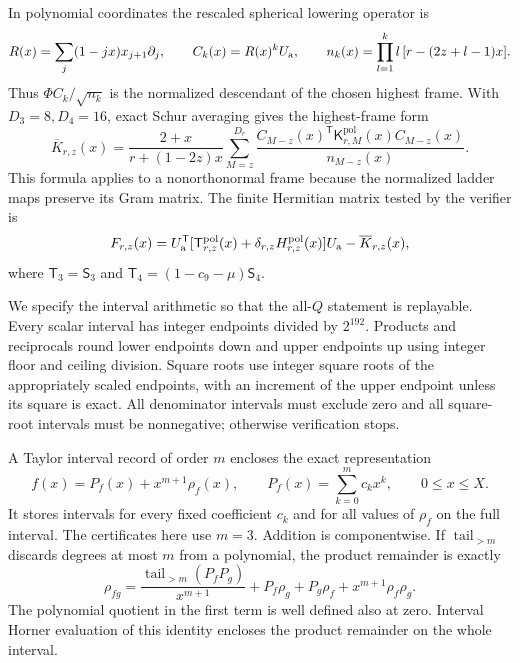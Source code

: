 In polynomial coordinates the rescaled spherical lowering operator is
\begin{equation}\label{eq:interval-descendant-polynomial}
 R(x)=\sum_j(1-jx)x_{j+1}\partial_j,
 \qquad C_k(x)=R(x)^kU_{\rm a},\qquad
 n_k(x)=\prod_{l=1}^k l\,[r-(2z+l-1)x].
\end{equation}
Thus $\Phi C_k/\sqrt{n_k}$ is the normalized descendant of the chosen
highest frame. With $D_3=8,D_4=16$, exact Schur averaging gives the
highest-frame form
\begin{equation}\label{eq:interval-Schur}
 \overline K_{r,z}(x)=\frac{2+x}{r+(1-2z)x}
 \sum_{M=z}^{D_r}
 \frac{C_{M-z}(x)^{\mathsf T}\mathsf K^{\mathrm{pol}}_{r,M}(x)
 C_{M-z}(x)}{n_{M-z}(x)}.
\end{equation}
This formula applies to a nonorthonormal frame because the normalized
ladder maps preserve its Gram matrix. The finite Hermitian matrix tested
by the verifier is
\begin{equation}\label{eq:interval-final-matrix}
 F_{r,z}(x)=U_{\rm a}^{\mathsf T}
  [\mathsf T^{\mathrm{pol}}_{r,z}(x)
     +\delta_{r,z}H^{\mathrm{pol}}_{r,z}(x)]U_{\rm a}
       -\overline K_{r,z}(x),
\end{equation}
where $\mathsf T_3=\mathsf S_3$ and
$\mathsf T_4=(1-c_9-\mu)\mathsf S_4$.

We specify the interval arithmetic so that the all-$Q$ statement is
replayable. Every scalar interval has integer endpoints divided by
$2^{192}$. Products and reciprocals round lower endpoints down and upper
endpoints up using integer floor and ceiling division. Square roots use
integer square roots of the appropriately scaled endpoints, with an
increment of the upper endpoint unless its square is exact. All
denominator intervals must exclude zero and all square-root intervals
must be nonnegative; otherwise verification stops.

A Taylor interval record of order $m$ encloses the exact representation
\begin{equation}\label{eq:interval-jet-definition}
 f(x)=P_f(x)+x^{m+1}\rho_f(x),\qquad
 P_f(x)=\sum_{k=0}^m c_kx^k,\qquad 0\le x\le X.
\end{equation}
It stores intervals for every fixed coefficient $c_k$ and for all values
of $\rho_f$ on the full interval. The certificates here use $m=3$.
Addition is componentwise. If $\operatorname{tail}_{>m}$ discards
degrees at most $m$ from a polynomial, the product remainder is exactly
\begin{equation}\label{eq:interval-jet-product}
 \rho_{fg}=
 \frac{\operatorname{tail}_{>m}(P_fP_g)}{x^{m+1}}
 +P_f\rho_g+P_g\rho_f+x^{m+1}\rho_f\rho_g.
\end{equation}
The polynomial quotient in the first term is well defined also at zero.
Interval Horner evaluation of this identity encloses the product
remainder on the whole interval.

